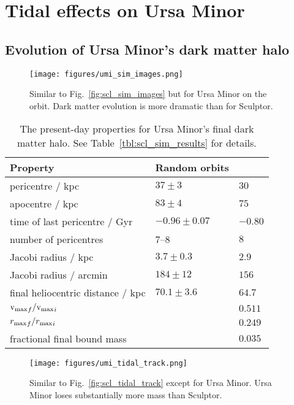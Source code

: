 \section{Tidal effects on Ursa Minor}\label{tidal-effects-on-ursa-minor}

\subsection{Evolution of Ursa Minor's dark matter
halo}\label{evolution-of-ursa-minors-dark-matter-halo}

\begin{figure}
\centering
\texttt{[image: figures/umi\_sim\_images.png]}
\caption[Ursa Minor simulation snapshots]{Similar to
Fig.~\ref{fig:scl_sim_images} but for Ursa Minor on the \smallperi{}
orbit. Dark matter evolution is more dramatic than for
Sculptor.}\label{fig:umi_sim_images}
\end{figure}

\begin{table*}[t]
\centering
\caption[Simulation results for Ursa Minor’s dark matter]{The present-day properties for Ursa Minor’s final dark matter halo. See Table \ref{tbl:scl_sim_results} for details. }
\label{tbl:umi_sim_results}
\begin{tabular}{lll}
\toprule
Property & Random orbits & \smallperi{}\\
\midrule
pericentre $/$ kpc & $37\pm3$ & $30$\\
apocentre $/$ kpc & $83 \pm 4$ & $75$\\
time of last pericentre $/$ Gyr & $-0.96 \pm 0.07$ & $-0.80$\\
number of pericentres & 7–8 & $8$\\
Jacobi radius $/$ kpc & $3.7 \pm 0.3$ & $2.9$\\
Jacobi radius $/$ arcmin & $184 \pm 12$ & $156$\\
final heliocentric distance $/$ kpc & $70.1 \pm 3.6$ & $64.7$\\
${{\rm v}_{\rm max}}_f / {{\rm v}_{\rm max}}_i$ &  & $0.511$\\
${r_{\rm max}}_f / {r_{\rm max}}_i$ &  & $0.249$\\
fractional final bound mass &  & $0.035$\\
\bottomrule
\end{tabular}
\end{table*}

\begin{figure}
\centering
\texttt{[image: figures/umi\_tidal\_track.png]}
\caption[Ursa Minor tidal tracks]{Similar to
Fig.~\ref{fig:scl_tidal_track} except for Ursa Minor. Ursa Minor loses
substantially more mass than Sculptor.}\label{fig:umi_tidal_track}
\end{figure}

